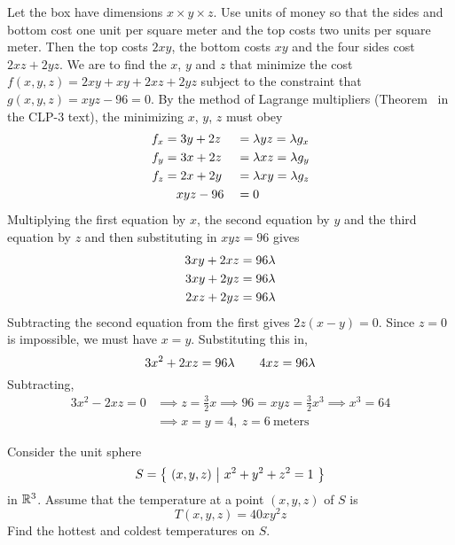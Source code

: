 \begin{solution}
Let the box have dimensions $x\times y\times z$. Use units
of money so that the sides and bottom cost one unit per square meter and
the top costs two units per square meter. Then the top costs $2xy$, the
bottom costs $xy$ and the four sides cost $2xz+2yz$. We are to find the 
$x$, $y$ and $z$ that minimize the cost $f(x,y,z)=2xy +xy +2xz+2yz$ subject 
to the constraint that $g(x,y,z)=xyz-96=0$. By the method of
Lagrange multipliers (Theorem~ in the CLP-3 text),
the minimizing $x$, $y$, $z$ must obey
\begin{alignat*}{3}
f_x&=3y+2z&&=\lambda yz=\lambda g_x \\
f_y&=3x+2z&&=\lambda xz=\lambda g_y \\
f_z&=2x+2y&&=\lambda xy=\lambda g_z \\
&\ \ \ xyz-96&&=0
\end{alignat*}
Multiplying the first equation by $x$, the second equation by $y$ 
and the third equation by $z$ and then substituting in $xyz=96$ gives
\begin{align*}
3xy+2xz&=96\lambda \\
3xy+2yz&=96\lambda \\
2xz+2yz&=96\lambda 
\end{align*}
Subtracting the second equation from the first gives $2z(x-y)=0$.
Since $z=0$ is impossible, we must have $x=y$. Substituting this in,
\begin{equation*}
3x^2+2xz=96\lambda\qquad 4xz=96\lambda
\end{equation*}
Subtracting,
\begin{align*}
3x^2-2xz=0&\implies z=\frac{3}{2}x
\implies 96=xyz=\frac{3}{2}x^3
\implies x^3=64 \\
&\implies x=y=4,\ z=6\ \text{meters}
\end{align*}
\end{solution}

\begin{question}[M200 2003A] %
 Consider the unit sphere
\begin{equation*}
S=\big\{ \ (x,y,z)\ \big|\ x^2+y^2+z^2=1\ \big\}
\end{equation*}
in $\mathbb{R}^3$. Assume that the temperature at a point $(x,y,z)$ of $S$ is
\begin{equation*}
T(x,y,z)=40xy^2z
\end{equation*}
Find the hottest and coldest temperatures on $S$.
\end{question}

%

